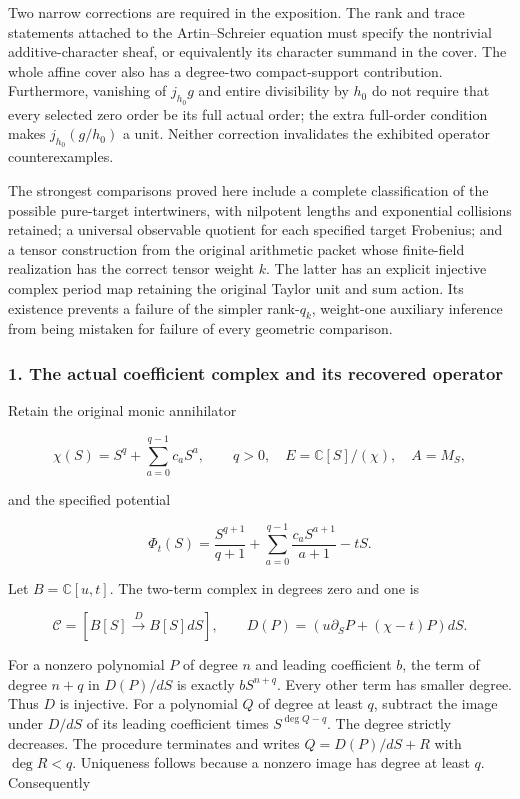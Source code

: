 Two narrow corrections are required in the exposition. The rank and trace statements attached to the Artin--Schreier equation must specify the nontrivial additive-character sheaf, or equivalently its character summand in the cover. The whole affine cover also has a degree-two compact-support contribution. Furthermore, vanishing of \(j_{h_0}g\) and entire divisibility by \(h_0\) do not require that every selected zero order be its full actual order; the extra full-order condition makes \(j_{h_0}(g/h_0)\) a unit. Neither correction invalidates the exhibited operator counterexamples.

The strongest comparisons proved here include a complete classification of the possible pure-target intertwiners, with nilpotent lengths and exponential collisions retained; a universal observable quotient for each specified target Frobenius; and a tensor construction from the original arithmetic packet whose finite-field realization has the correct tensor weight \(k\). The latter has an explicit injective complex period map retaining the original Taylor unit and sum action. Its existence prevents a failure of the simpler rank-\(q_k\), weight-one auxiliary inference from being mistaken for failure of every geometric comparison.

\subsubsection{1. The actual coefficient complex and its recovered operator}\label{endpoint-purity_review--the-actual-coefficient-complex-and-its-recovered-operator}

Retain the original monic annihilator

\[
\chi(S)=S^q+\sum_{a=0}^{q-1}c_aS^a,\qquad q>0,
\quad E=\mathbb C[S]/(\chi),\quad A=M_S,
\]

and the specified potential

\[
\Phi_t(S)=\frac{S^{q+1}}{q+1}
 +\sum_{a=0}^{q-1}\frac{c_aS^{a+1}}{a+1}-tS.
\tag{DP.1}
\]

Let \(B=\mathbb C[u,t]\). The two-term complex in degrees zero and one is

\[
\mathcal C=[B[S]\xrightarrow{D}B[S]dS],\qquad
D(P)=(u\partial_SP+(\chi-t)P)dS.
\tag{DP.2}
\]

For a nonzero polynomial \(P\) of degree \(n\) and leading coefficient \(b\), the term of degree \(n+q\) in \(D(P)/dS\) is exactly \(bS^{n+q}\). Every other term has smaller degree. Thus \(D\) is injective. For a polynomial \(Q\) of degree at least \(q\), subtract the image under \(D/dS\) of its leading coefficient times \(S^{\deg Q-q}\). The degree strictly decreases. The procedure terminates and writes \(Q=D(P)/dS+R\) with \(\deg R<q\). Uniqueness follows because a nonzero image has degree at least \(q\). Consequently

